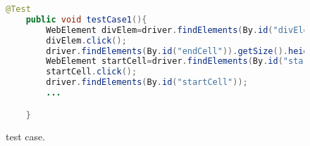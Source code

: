 \begin{figure}
\begin{lstlisting}[language=Java]
	@Test
	public void testCase1(){
		WebElement divElem=driver.findElements(By.id("divElem"));
		divElem.click();
		driver.findElements(By.id("endCell")).getSize().height;
		WebElement startCell=driver.findElements(By.id("startCell"));
		startCell.click();
		driver.findElements(By.id("startCell"));
		...

	}
\end{lstlisting}
\vspace{-0.1in} 

\caption{\selenium test case.}
\label{Fig:domTestExample}
\vspace{-0.2in} 
\end{figure}